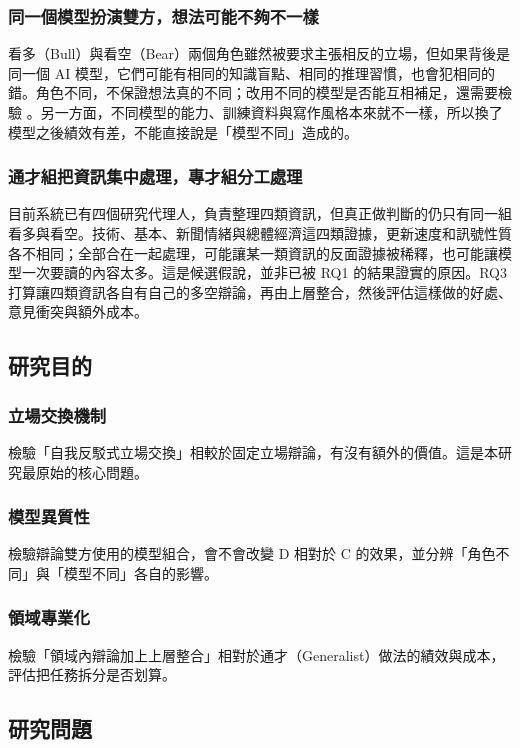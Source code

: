 \documentclass[12pt,a4paper]{article}
\numberwithin{table}{section}
\numberwithin{figure}{section}
\begin{document}
\subsubsection{同一個模型扮演雙方，想法可能不夠不一樣}
看多（Bull）與看空（Bear）兩個角色雖然被要求主張相反的立場，但如果背後是同一個 AI 模型，它們可能有相同的知識盲點、相同的推理習慣，也會犯相同的錯。角色不同，不保證想法真的不同；改用不同的模型是否能互相補足，還需要檢驗 \citep{zhang2025stop}。另一方面，不同模型的能力、訓練資料與寫作風格本來就不一樣，所以換了模型之後績效有差，不能直接說是「模型不同」造成的。

\subsubsection{通才組把資訊集中處理，專才組分工處理}
目前系統已有四個研究代理人，負責整理四類資訊，但真正做判斷的仍只有同一組看多與看空。技術、基本、新聞情緒與總體經濟這四類證據，更新速度和訊號性質各不相同；全部合在一起處理，可能讓某一類資訊的反面證據被稀釋，也可能讓模型一次要讀的內容太多。這是候選假說，並非已被 RQ1 的結果證實的原因。RQ3 打算讓四類資訊各自有自己的多空辯論，再由上層整合，然後評估這樣做的好處、意見衝突與額外成本。

\subsection{研究目的}

\subsubsection{立場交換機制}
檢驗「自我反駁式立場交換」相較於固定立場辯論，有沒有額外的價值。這是本研究最原始的核心問題。

\subsubsection{模型異質性}
檢驗辯論雙方使用的模型組合，會不會改變 D 相對於 C 的效果，並分辨「角色不同」與「模型不同」各自的影響。

\subsubsection{領域專業化}
檢驗「領域內辯論加上上層整合」相對於通才（Generalist）做法的績效與成本，評估把任務拆分是否划算。

\subsection{研究問題}
\end{document}
